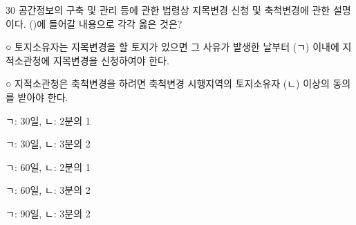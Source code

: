\begin{question}{30}
공간정보의 구축 및 관리 등에 관한 법령상 지목변경 신청 및 축척변경에 관한 설명이다. (\quad)에 들어갈 내용으로 각각 옳은 것은?
\begin{framedtext}
○ 토지소유자는 지목변경을 할 토지가 있으면 그 사유가 발생한 날부터 (ㄱ) 이내에 지적소관청에 지목변경을 신청하여야 한다. \par
○ 지적소관청은 축척변경을 하려면 축척변경 시행지역의 토지소유자 (ㄴ) 이상의 동의를 받아야 한다. \par
\end{framedtext}
\begin{choices}
  \item ㄱ: 30일, ㄴ: 2분의 1
  \item ㄱ: 30일, ㄴ: 3분의 2
  \item ㄱ: 60일, ㄴ: 2분의 1
  \item ㄱ: 60일, ㄴ: 3분의 2
  \item ㄱ: 90일, ㄴ: 3분의 2
\end{choices}
\end{question}
